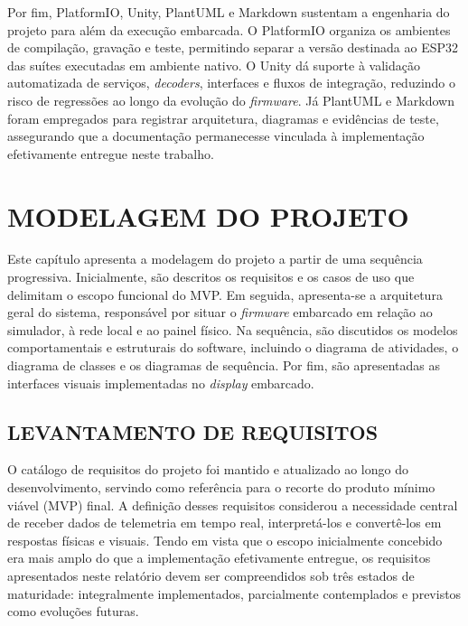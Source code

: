 \documentclass[
  12pt,
  oneside,
  a4paper,
  chapter=TITLE,
  section=TITLE,
  subsection=TITLE,
  brazil
]{abntex2}
\newcommand{\estrangeirismo}[1]{\textit{#1}}
\begin{document}
Por fim, PlatformIO, Unity, PlantUML e Markdown sustentam a engenharia do projeto para além da execução embarcada. O PlatformIO organiza os ambientes de compilação, gravação e teste, permitindo separar a versão destinada ao ESP32 das suítes executadas em ambiente nativo. O Unity dá suporte à validação automatizada de serviços, \estrangeirismo{decoders}, interfaces e fluxos de integração, reduzindo o risco de regressões ao longo da evolução do \estrangeirismo{firmware}. Já PlantUML e Markdown foram empregados para registrar arquitetura, diagramas e evidências de teste, assegurando que a documentação permanecesse vinculada à implementação efetivamente entregue neste trabalho.

\chapter{MODELAGEM DO PROJETO}

Este capítulo apresenta a modelagem do projeto a partir de uma sequência progressiva. Inicialmente, são descritos os requisitos e os casos de uso que delimitam o escopo funcional do MVP. Em seguida, apresenta-se a arquitetura geral do sistema, responsável por situar o \estrangeirismo{firmware} embarcado em relação ao simulador, à rede local e ao painel físico. Na sequência, são discutidos os modelos comportamentais e estruturais do software, incluindo o diagrama de atividades, o diagrama de classes e os diagramas de sequência. Por fim, são apresentadas as interfaces visuais implementadas no \estrangeirismo{display} embarcado.

\section{LEVANTAMENTO DE REQUISITOS}

O catálogo de requisitos do projeto foi mantido e atualizado ao longo do desenvolvimento, servindo como referência para o recorte do produto mínimo viável (MVP) final. A definição desses requisitos considerou a necessidade central de receber dados de telemetria em tempo real, interpretá-los e convertê-los em respostas físicas e visuais. Tendo em vista que o escopo inicialmente concebido era mais amplo do que a implementação efetivamente entregue, os requisitos apresentados neste relatório devem ser compreendidos sob três estados de maturidade: integralmente implementados, parcialmente contemplados e previstos como evoluções futuras.
\end{document}

